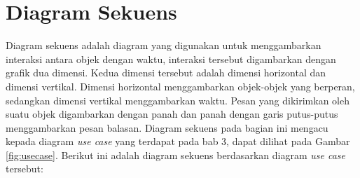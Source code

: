 \section{Diagram Sekuens}
Diagram sekuens adalah diagram yang digunakan untuk menggambarkan interaksi
antara objek dengan waktu, interaksi tersebut digambarkan dengan grafik dua
dimensi. Kedua dimensi tersebut adalah dimensi horizontal dan dimensi vertikal.
Dimensi horizontal menggambarkan objek-objek yang berperan, sedangkan dimensi
vertikal menggambarkan waktu. Pesan yang dikirimkan oleh suatu objek digambarkan
dengan panah dan panah dengan garis putus-putus menggambarkan pesan balasan.
Diagram sekuens pada bagian ini mengacu kepada diagram \textit{use case} yang
terdapat pada bab 3, dapat dilihat pada Gambar \ref{fig:usecase}. Berikut ini
adalah diagram sekuens berdasarkan diagram \textit{use case} tersebut:
